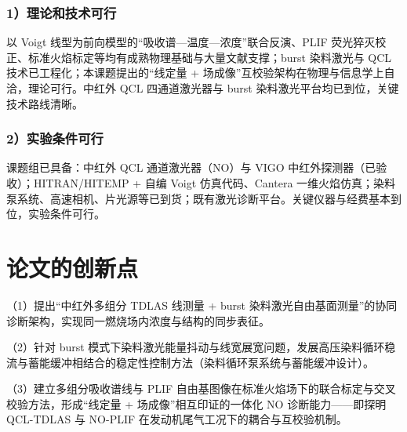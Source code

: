 \subsubsection{1）理论和技术可行}

以 Voigt 线型为前向模型的``吸收谱—温度—浓度''联合反演、PLIF 荧光猝灭校正、标准火焰标定等均有成熟物理基础与大量文献支撑；burst 染料激光与 QCL 技术已工程化；本课题提出的``线定量 + 场成像''互校验架构在物理与信息学上自洽，理论可行。中红外 QCL 四通道激光器与 burst 染料激光平台均已到位，关键技术路线清晰。

\subsubsection{2）实验条件可行}

课题组已具备：中红外 QCL 通道激光器（NO）与 VIGO 中红外探测器（已验收）；HITRAN/HITEMP + 自编 Voigt 仿真代码、Cantera 一维火焰仿真；染料泵系统、高速相机、片光源等已到货；既有激光诊断平台。关键仪器与经费基本到位，实验条件可行。

\section{论文的创新点}

（1）提出``中红外多组分 TDLAS 线测量 + burst 染料激光自由基面测量''的协同诊断架构，实现同一燃烧场内浓度与结构的同步表征。

（2）针对 burst 模式下染料激光能量抖动与线宽展宽问题，发展高压染料循环稳流与蓄能缓冲相结合的稳定性控制方法（染料循环泵系统与蓄能缓冲设计）。

（3）建立多组分吸收谱线与 PLIF 自由基图像在标准火焰场下的联合标定与交叉校验方法，形成``线定量 + 场成像''相互印证的一体化 NO 诊断能力——即探明 QCL-TDLAS 与 NO-PLIF 在发动机尾气工况下的耦合与互校验机制。
